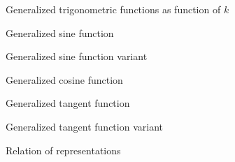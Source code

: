 \documentclass[../main.tex]{subfiles}
\begin{document}
\begin{figure}
    \centering
    
    \caption{Generalized trigonometric functions as function of \(k\)}\label{TrigonometryPlotted}
\end{figure}
\begin{figure}
    \centering
    
    \caption{Generalized sine function}\label{TrigonometrySinePlotted}
\end{figure}
\begin{figure}
    \centering
    
    \caption{Generalized sine function variant}\label{TrigonometrySineVarPlotted}
\end{figure}
\begin{figure}
    \centering
    
    \caption{Generalized cosine function}\label{TrigonometryCosinePlotted}
\end{figure}
\begin{figure}
    \centering
    
    \caption{Generalized tangent function}\label{TrigonometryTangentPlotted}
\end{figure}
\begin{figure}
    \centering
    
    \caption{Generalized tangent function variant}\label{TrigonometryTangentVarPlotted}
\end{figure}
\begin{figure}
    \centering
    
    \caption{Relation of representations}\label{PointMapping}
\end{figure}
\end{document}
